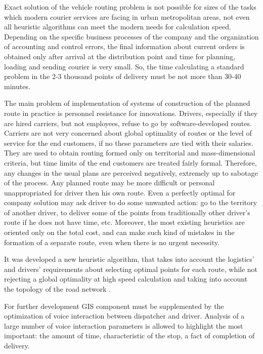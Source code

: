 Exact solution of the vehicle routing problem is not possible for sizes of the tasks which modern courier services are facing in urban metropolitan areas, not even all heuristic algorithms can meet the modern needs for calculation speed. Depending on the specific business processes of the company and the organization of accounting and control errors, the final information about current orders is obtained only after arrival at the distribution point and time for planning, loading and sending courier is very small. So, the time calculating a standard problem in the 2-3 thousand points of delivery must be not more than 30-40 minutes.

The main problem of implementation of systems of construction of the planned route in practice is personnel resistance for innovations. Drivers, especially if they are hired carriers, but not employees, refuse to go by software-developed routes. Carriers are not very concerned about global optimality of routes or the level of service for the end customers, if no these parameters are tied with their salaries. They are used to obtain routing formed only on territorial and mass-dimensional criteria, but time limits of the end customers are treated fairly formal. Therefore, any changes in the usual plans are perceived negatively, extremely up to sabotage of the process. Any planned route may be more difficult or personal unappropriated for driver then his own route. Even a perfectly optimal for company solution may ask driver to do some unwanted action: go to the territory of another driver, to deliver some of the points from traditionally other driver’s route if he does not have time, etc. Moreover, the most existing heuristics are oriented only on the total cost, and can make such kind of mistakes in the formation of a separate route, even when there is no urgent necessity.

It was developed a new heuristic algorithm, that takes into account the logistics’ and drivers’ requirements about selecting optimal points for each route, while not rejecting a global optimality at high speed calculation and taking into account the topology of the road network \cite{eng_art1}. 

For further development GIS component must be supplemented by the optimization of voice interaction between dispatcher and driver. Analysis of a large number of voice interaction parameters is allowed to highlight the most important: the amount of time, characteristic of the stop, a fact of completion of delivery.

